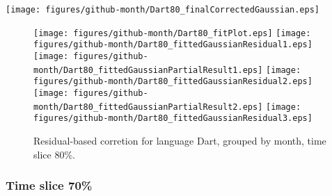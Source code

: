 \begin{center}
{\texttt{[image: figures/github-month/Dart80\_finalCorrectedGaussian.eps]}}
\end{center}

\FloatBarrier

\begin{figure}[t]
\centering
{}
{\texttt{[image: figures/github-month/Dart80\_fitPlot.eps]}}
{\texttt{[image: figures/github-month/Dart80\_fittedGaussianResidual1.eps]}}
{\texttt{[image: figures/github-month/Dart80\_fittedGaussianPartialResult1.eps]}}
{\texttt{[image: figures/github-month/Dart80\_fittedGaussianResidual2.eps]}}
{\texttt{[image: figures/github-month/Dart80\_fittedGaussianPartialResult2.eps]}}
{\texttt{[image: figures/github-month/Dart80\_fittedGaussianResidual3.eps]}}
\caption{Residual-based corretion for language Dart, grouped by month, time slice 80\%.}
\end{figure}


\FloatBarrier


\subsubsection{Time slice 70\%}

